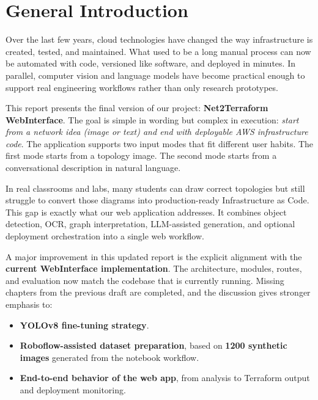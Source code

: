 \documentclass[12pt,a4paper,openany]{report}
\begin{document}

\chapter*{General Introduction}

Over the last few years, cloud technologies have changed the way infrastructure is created, tested, and maintained. What used to be a long manual process can now be automated with code, versioned like software, and deployed in minutes. In parallel, computer vision and language models have become practical enough to support real engineering workflows rather than only research prototypes.

This report presents the final version of our project: \textbf{Net2Terraform WebInterface}. The goal is simple in wording but complex in execution: \textit{start from a network idea (image or text) and end with deployable AWS infrastructure code}. The application supports two input modes that fit different user habits. The first mode starts from a topology image. The second mode starts from a conversational description in natural language.

In real classrooms and labs, many students can draw correct topologies but still struggle to convert those diagrams into production-ready Infrastructure as Code. This gap is exactly what our web application addresses. It combines object detection, OCR, graph interpretation, LLM-assisted generation, and optional deployment orchestration into a single web workflow.

A major improvement in this updated report is the explicit alignment with the \textbf{current WebInterface implementation}. The architecture, modules, routes, and evaluation now match the codebase that is currently running. Missing chapters from the previous draft are completed, and the discussion gives stronger emphasis to:
\begin{itemize}
    \item \textbf{YOLOv8 fine-tuning strategy}.
    \item \textbf{Roboflow-assisted dataset preparation}, based on \textbf{1200 synthetic images} generated from the notebook workflow.
    \item \textbf{End-to-end behavior of the web app}, from analysis to Terraform output and deployment monitoring.
\end{itemize}
\end{document}
